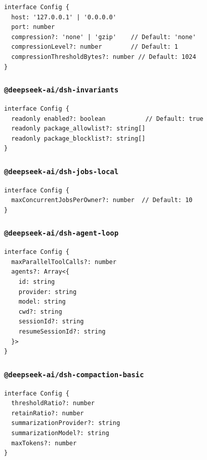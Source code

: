 \documentclass[11pt,a4paper]{article}
\begin{document}
\begin{lstlisting}
interface Config {
  host: '127.0.0.1' | '0.0.0.0'
  port: number
  compression?: 'none' | 'gzip'    // Default: 'none'
  compressionLevel?: number        // Default: 1
  compressionThresholdBytes?: number // Default: 1024
}
\end{lstlisting}


\subsubsection*{\texttt{@deepseek-ai/dsh-invariants}}


\begin{lstlisting}
interface Config {
  readonly enabled?: boolean           // Default: true
  readonly package_allowlist?: string[]
  readonly package_blocklist?: string[]
}
\end{lstlisting}


\subsubsection*{\texttt{@deepseek-ai/dsh-jobs-local}}


\begin{lstlisting}
interface Config {
  maxConcurrentJobsPerOwner?: number  // Default: 10
}
\end{lstlisting}


\subsubsection*{\texttt{@deepseek-ai/dsh-agent-loop}}


\begin{lstlisting}
interface Config {
  maxParallelToolCalls?: number
  agents?: Array<{
    id: string
    provider: string
    model: string
    cwd?: string
    sessionId?: string
    resumeSessionId?: string
  }>
}
\end{lstlisting}


\subsubsection*{\texttt{@deepseek-ai/dsh-compaction-basic}}


\begin{lstlisting}
interface Config {
  thresholdRatio?: number
  retainRatio?: number
  summarizationProvider?: string
  summarizationModel?: string
  maxTokens?: number
}
\end{lstlisting}
\end{document}
